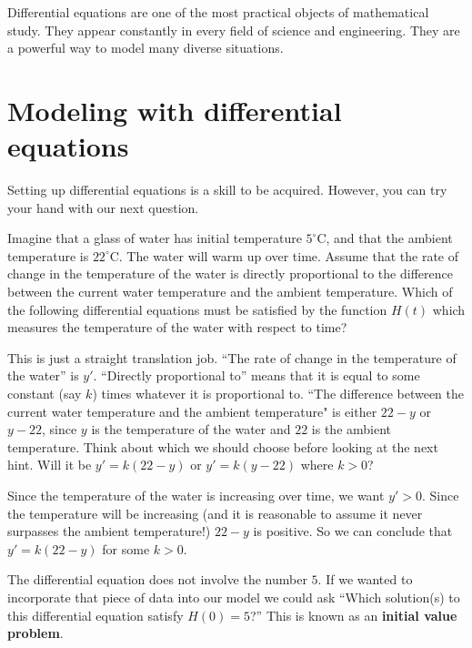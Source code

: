 \documentclass{ximera}
\begin{document}
Differential equations are one of the most practical objects of
mathematical study.  They appear constantly in every field of science
and engineering.  They are a powerful way to model many diverse
situations.





\section{Modeling with differential equations}

Setting up differential equations is a skill to be acquired. However,
you can try your hand with our next question.

\begin{question}
  Imagine that a glass of water has initial temperature $5^\circ
  \mathrm{C}$, and that the ambient temperature is $22^\circ \mathrm{C}$.
  The water will warm up over time.  Assume that the rate of change in
  the temperature of the water is directly proportional to the
  difference between the current water temperature and the ambient
  temperature.  Which of the following differential equations must be
  satisfied by the function $H(t)$ which measures the temperature of
  the water with respect to time?
  \begin{multipleChoice}
  \end{multipleChoice}
  \begin{hint}
    This is just a straight translation job.  ``The rate of change in
    the temperature of the water'' is $y'$.  ``Directly proportional
    to'' means that it is equal to some constant (say $k$) times
    whatever it is proportional to.  ``The difference between the
    current water temperature and the ambient temperature" is either
    $22-y$ or $y-22$, since $y$ is the temperature of the water and
    $22$ is the ambient temperature.  Think about which we should
    choose before looking at the next hint.  Will it be $y'=k(22-y)$
    or $y'=k(y-22)$ where $k>0$?
  \end{hint}
  \begin{hint}
    Since the temperature of the water is increasing over time, we
    want $y'>0$.  Since the temperature will be increasing (and it is
    reasonable to assume it never surpasses the ambient temperature!)
    $22-y$ is positive.  So we can conclude that $y' = k(22-y)$ for
    some $k>0$.
  \end{hint}
  
  \begin{feedback}
    The differential equation does not involve the number $5$.  If we
    wanted to incorporate that piece of data into our model we could
    ask ``Which solution(s) to this differential equation satisfy
    $H(0) = 5$?''  This is known as an \textbf{initial value problem}.  %
  \end{feedback}
\end{question}
\end{document}
